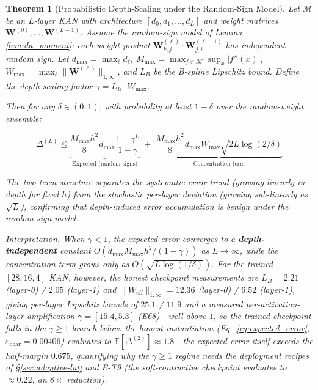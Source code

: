 \documentclass[journal,onecolumn]{IEEEtran}
\newtheorem{theorem}{Theorem}
\begin{document}
\setcounter{theorem}{3}
\begin{theorem}[Probabilistic Depth-Scaling under the Random-Sign Model]
\label{thm:deep}
Let $\mathcal{M}$ be an $L$-layer KAN with architecture
$[d_0, d_1, \dots, d_L]$ and weight matrices
$\mathbf{W}^{(0)}, \dots, \mathbf{W}^{(L-1)}$. Assume the random-sign
model of Lemma~
\ref{lem:da_moment}: each weight product $\mathbf{W}^{(\ell)}_{k,j} \cdot
\mathbf{W}^{(\ell-1)}_{j,i}$ has independent random sign. Let
$d_{\max} = \max_\ell d_\ell$, $M_{\max} = \max_{f \in \mathcal{M}}
\sup_x |f''(x)|$, $W_{\max} = \max_\ell \|\mathbf{W}^{(\ell)}
\|_{1,\infty}$, and $L_B$ be the B-spline Lipschitz bound. Define
the depth-scaling factor $\gamma = L_B \cdot W_{\max}$.

Then for any $\delta \in (0,1)$, with probability at least $1-\delta$
over the random-weight ensemble:

{\small
\begin{equation}
\Delta^{(L)} \leq
\underbrace{\frac{M_{\max} h^2}{8} d_{\max}
\frac{1 - \gamma^L}{1 - \gamma}
}_{\text{Expected (random signs)}}
\;+\;
\underbrace{\frac{M_{\max} h^2}{8} d_{\max} W_{\max}
\sqrt{2L \log(2/\delta)}
}_{\text{Concentration term}}
\label{eq:deep_prob_bound}
\end{equation}}

The two-term structure separates the \textit{systematic} error trend
(growing linearly in depth for fixed $h$) from the
\textit{stochastic} per-layer deviation (growing sub-linearly as
$\sqrt{L}$), confirming that depth-induced error accumulation is
benign under the random-sign model.

\vspace{2pt}
\noindent\textit{Interpretation.}
When $\gamma < 1$, the expected error converges to a
\textbf{depth-independent} constant
$O(d_{\max} M_{\max} h^2/(1-\gamma))$ as $L \to \infty$, while the
concentration term grows only as $O(\sqrt{L \log(1/\delta)})$.
For the trained $[28,16,4]$ KAN, however, the honest checkpoint
measurements are $L_B = 2.21$ (layer-0) / $2.05$ (layer-1) and
$\|W_{\text{eff}}\|_{1,\infty} = 12.36$ (layer-0) / $6.52$ (layer-1),
giving per-layer Lipschitz bounds of $25.1$ / $11.9$ and a measured
per-activation-layer amplification $\gamma = [15.4, 5.3]$ (E68)---well
above $1$, so the trained checkpoint falls in the $\gamma \geq 1$ branch
below: the honest instantiation (Eq.~\ref{eq:expected_error},
$\varepsilon_{\text{char}} = 0.00406$) evaluates to
$\mathbb{E}[\Delta^{(2)}] \approx 1.8$---the expected error itself
exceeds the half-margin $0.675$, quantifying why the $\gamma \geq 1$
regime needs the deployment recipes of {\S}\ref{sec:adaptive-lut} and
E-T9 (the soft-contractive checkpoint evaluates to $\approx 0.22$, an
$8\times$ reduction).


\end{theorem}
\end{document}
